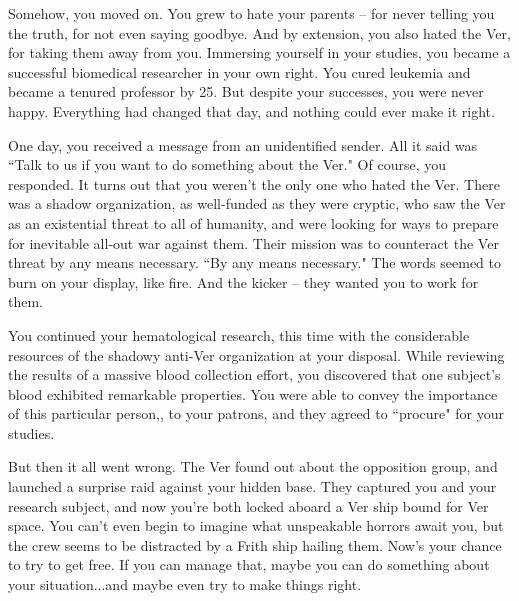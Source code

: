 \documentclass[char]{guildcamp4}
\begin{document}
Somehow, you moved on. You grew to hate your parents -- for never telling you the truth, for not even saying goodbye. And by extension, you also hated the Ver, for taking them away from you. Immersing yourself in your studies, you became a successful biomedical researcher in your own right. You cured leukemia and became a tenured professor by 25. But despite your successes, you were never happy. Everything had changed that day, and nothing could ever make it right.

One day, you received a message from an unidentified sender. All it said was ``Talk to us if you want to do something about the Ver." Of course, you responded. It turns out that you weren't the only one who hated the Ver. There was a shadow organization, as well-funded as they were cryptic, who saw the Ver as an existential threat to all of humanity, and were looking for ways to prepare for inevitable all-out war against them. Their mission was to counteract the Ver threat by any means necessary. ``By any means necessary." The words seemed to burn on your display, like fire. And the kicker -- they wanted you to work for them.

You continued your hematological research, this time with the considerable resources of the shadowy anti-Ver organization at your disposal. While reviewing the results of a massive blood collection effort, you discovered that one subject's blood exhibited remarkable properties. You were able to convey the importance of this particular person,\cPlead{\MYname}, to your patrons, and they agreed to ``procure"  for your studies. 

But then it all went wrong. The Ver found out about the opposition group, and launched a surprise raid against your hidden base. They captured you and your research subject, and now you're both locked aboard a Ver ship bound for Ver space. You can't even begin to imagine what unspeakable horrors await you, but the crew seems to be distracted by a Frith ship hailing them. Now's your chance to try to get free. If you can manage that, maybe you can do something about your situation...and maybe even try to make things right.
\end{document}
